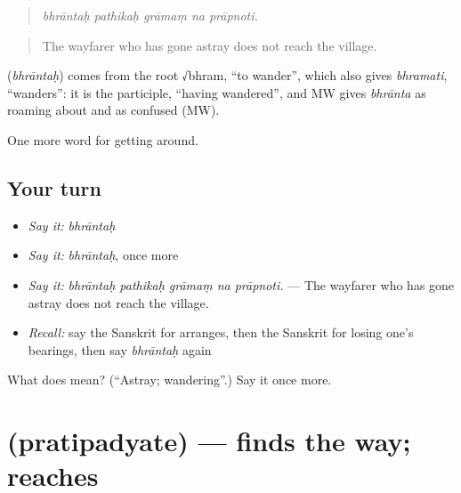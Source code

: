 \begin{quote}
    
\end{quote}

\begin{quote}
\emph{bhrāntaḥ pathikaḥ grāmaṃ na prāpnoti.}
\end{quote}

\begin{quote}
The wayfarer who has gone astray does not reach the village.
\end{quote}

\begin{cousinweb}
\textbf{} (\emph{bhrāntaḥ}) comes from the root √bhram, \textquotedblleft{}to wander\textquotedblright{}, which also gives \emph{bhramati}, \textquotedblleft{}wanders\textquotedblright{}: it is the participle, \textquotedblleft{}having wandered\textquotedblright{}, and MW gives \emph{bhrānta} as roaming about and as confused (MW).
\end{cousinweb}

\begin{grammarlens}[title={What you've built}]
One more word for getting around.
\end{grammarlens}

\subsection*{Your turn}
\begin{itemize}
\raggedright
  \item \emph{Say it:} \emph{bhrāntaḥ}
  \item \emph{Say it:} \emph{bhrāntaḥ}, once more
  \item \emph{Say it:} \emph{bhrāntaḥ pathikaḥ grāmaṃ na prāpnoti.} — The wayfarer who has gone astray does not reach the village.
  \item \emph{Recall:} say the Sanskrit for arranges, then the Sanskrit for losing one's bearings, then say \emph{bhrāntaḥ} again
\end{itemize}

\begin{tcolorbox}[breakable,colback=teal!4,colframe=teal!35!black,title={Before you move on}]
What does  mean? (\textquotedblleft{}Astray; wandering\textquotedblright{}.) Say it once more.
\end{tcolorbox}
\section[\texorpdfstring{\sk{प्रतिपद्यते} (pratipadyate)}{प्रतिपद्यते (pratipadyate)}]{ (pratipadyate) — finds the way; reaches}

